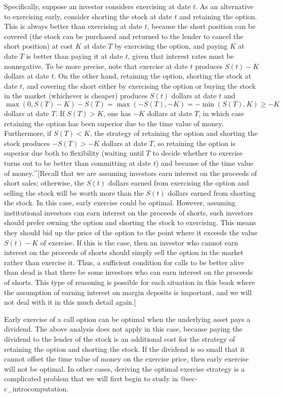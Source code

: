 Specifically, suppose an investor considers exercising at date $t$.  As an alternative to exercising early, consider shorting the stock at date $t$ and retaining the option.  This is always better than exercising at date $t$, because the short position can  be covered (the stock can be purchased and returned to the lender to cancel the short position) at cost $K$ at date $T$ by exercising the option, and paying $K$ at date $T$ is better than paying it at date $t$, given that interest rates must be nonnegative.  To be more precise, note that exercise at date $t$ produces  $S(t)-K$ dollars at date $t$.  On the other hand, retaining the option, shorting the stock at date $t$, and covering the short either by exercising the option or buying the stock in the market (whichever is cheaper) produces $S(t)$ dollars at date $t$ and 
$$\max(0,S(T)-K) - S(T) = \max(-S(T), -K) = -\min(S(T),K) \geq -K$$
dollars at date $T$.  If $S(T)>K$, one has $-K$ dollars at date $T$, in which case retaining the option has been superior due to the time value of money.  Furthermore,  if $S(T)<K$, the strategy of retaining the option and shorting the stock produces $-S(T) > -K$ dollars at date $T$, so retaining the option is superior due both to flexibility (waiting until $T$ to decide whether to exercise turns out to be better than committing at date $t$) and because of the time value of money.^[Recall that we are assuming investors earn interest on the proceeds of short sales; otherwise, the $S(t)$ dollars earned from exercising the option and selling the stock will be worth more than the $S(t)$ dollars earned from shorting the stock.  In this case, early exercise could be optimal.  However, assuming institutional investors can earn interest on the proceeds of shorts,  such investors should prefer owning the option and shorting the stock to exercising.  This means  they should bid up the price of the option to the point where it exceeds the value $S(t)-K$ of exercise.  If this is the case, then an investor who cannot earn interest on the proceeds of shorts should simply sell the option in the market rather than exercise it.  Thus, a sufficient condition for calls to be better alive than dead is that there be some investors who can earn interest on the proceeds of shorts.  This type of reasoning is possible for each situation in this book where the assumption of earning interest on margin deposits is important, and we will not deal with it in this much detail again.]

Early exercise of a call option can be optimal when the underlying asset pays a dividend.  The above analysis does not apply in this case, because paying the dividend to the lender of the stock is an additional cost for the strategy of retaining the option and shorting the stock.  If the dividend is so small that it cannot offset the time value of money on the exercise price, then early exercise will not be optimal.  In other cases, deriving the optimal exercise strategy is a complicated problem that we will first begin to study in @sec-c_introcomputation.

